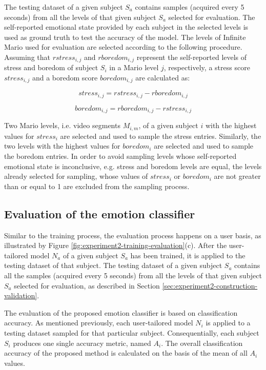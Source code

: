 The testing dataset of a given subject $S_a$ contains samples (acquired every 5 seconds) from all the levels of that given subject $S_a$ selected for evaluation. The self-reported emotional state provided by each subject in the selected levels is used as ground truth to test the accuracy of the model. The levels of Infinite Mario used for evaluation are selected according to the following procedure. Assuming that $rstress_{i,j}$ and $rboredom_{i,j}$ represent the self-reported levels of stress and boredom of subject $S_i$ in a Mario level $j$, respectively, a stress score $stress_{i,j}$ and a boredom score $boredom_{i,j}$ are calculated as:

\begin{equation}
  stress_{i,j} = rstress_{i,j} - rboredom_{i,j}
  \label{eq:stress-score}
\end{equation}

\begin{equation}
  boredom_{i,j} = rboredom_{i,j} - rstress_{i,j}
  \label{eq:boredom-score}
\end{equation}

Two Mario levels, i.e. video segments $M_{i,m}$, of a given subject $i$ with the highest values for $stress_i$ are selected and used to sample the stress entries. Similarly, the two levels with the highest values for $boredom_i$ are selected and used to sample the boredom entries. In order to avoid sampling levels whose self-reported emotional state is inconclusive, e.g. stress and boredom levels are equal, the levels already selected for sampling, whose values of $stress_i$ or $boredom_i$ are not greater than or equal to 1 are excluded from the sampling process.

\subsection{Evaluation of the emotion classifier}

Similar to the training process, the evaluation process happens on a user basis, as illustrated by Figure \ref{fig:experiment2-training-evaluation}(c). After the user-tailored model $N_a$ of a given subject $S_a$ has been trained, it is applied to the testing dataset of that subject. The testing dataset of a given subject $S_a$ contains all the samples (acquired every 5 seconds) from all the levels of that given subject $S_a$ selected for evaluation, as described in Section \ref{sec:experiment2-construction-validation}.

The evaluation of the proposed emotion classifier is based on classification accuracy. As mentioned previously, each user-tailored model $N_i$ is applied to a testing dataset sampled for that particular subject. Consequentially, each subject $S_i$ produces one single accuracy metric, named $A_i$. The overall classification accuracy of the proposed method is calculated on the basis of the mean of all $A_i$ values.

